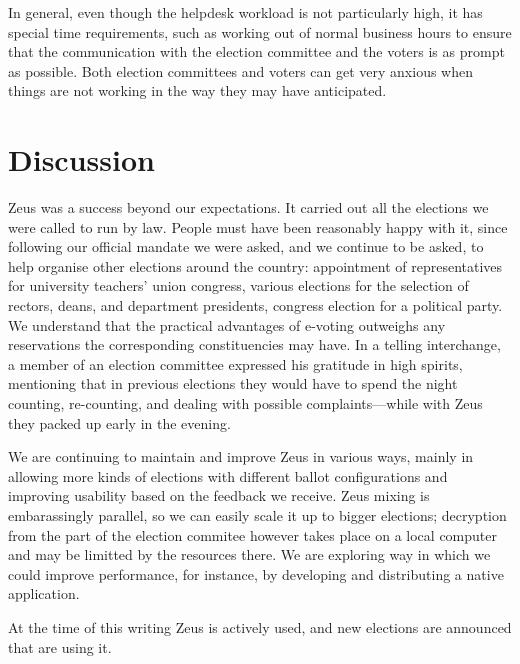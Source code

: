 \documentclass[letterpaper,10pt]{article}
\begin{document}
In general, even though the helpdesk workload is not particularly
high, it has special time requirements, such as working out of normal
business hours to ensure that the communication with the election
committee and the voters is as prompt as possible. Both election
committees and voters can get very anxious when things are not working
in the way they may have anticipated.



\section{Discussion}

Zeus was a success beyond our expectations. It carried out all the
elections we were called to run by law. People must have been
reasonably happy with it, since following our official mandate we were
asked, and we continue to be asked, to help organise other elections
around the country: appointment of representatives for university
teachers' union congress, various elections for the selection of
rectors, deans, and department presidents, congress election for a
political party. We understand that the practical advantages of
e-voting outweighs any reservations the corresponding constituencies
may have. In a telling interchange, a member of an election committee
expressed his gratitude in high spirits, mentioning that in previous
elections they would have to spend the night counting, re-counting,
and dealing with possible complaints---while with Zeus they packed up
early in the evening.

We are continuing to maintain and improve Zeus in various ways, mainly
in allowing more kinds of elections with different ballot
configurations and improving usability based on the feedback we
receive. Zeus mixing is embarassingly parallel, so we can easily scale
it up to bigger elections; decryption from the part of the election
commitee however takes place on a local computer and may be limitted
by the resources there. We are exploring way in which we could improve
performance, for instance, by developing and distributing a native
application.

At the time of this writing Zeus is actively used, and new elections
are announced that are using it. 
\end{document}

